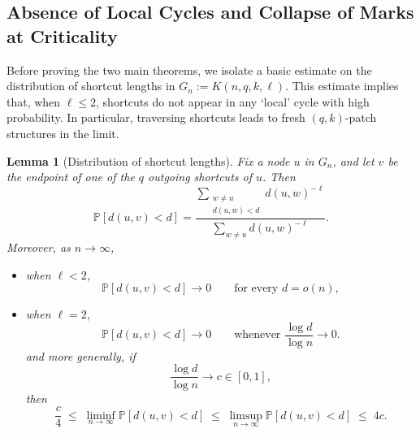 \documentclass[10pt]{amsart}
\newtheorem{lemma}[theorem]{Lemma}
\begin{document}
\subsection{Absence of Local Cycles and Collapse of Marks at Criticality}

Before proving the two main theorems, we isolate a basic estimate on the distribution of shortcut lengths in
\(
G_n:=K(n,q,k,\ell).
\)
This estimate implies that, when $\ell\le 2$, shortcuts do not appear in any `local' cycle with high probability. In particular, traversing shortcuts leads to fresh $(q,k)$-patch structures in the limit.

\begin{lemma}[Distribution of shortcut lengths]\label{shortcut-length-distribution}
Fix a node $u$ in $G_n$, and let $v$ be the endpoint of one of the $q$ outgoing shortcuts of $u$. Then
\[
\mathbb P[d(u,v)<d]
=
\frac{\sum_{\substack{w\neq u\\ d(u,w)<d}} d(u,w)^{-\ell}}
{\sum_{w\neq u} d(u,w)^{-\ell}}.
\]
Moreover, as $n\to\infty$,
\begin{itemize}
    \item when $\ell<2$,
    \[
    \mathbb P[d(u,v)<d]\to 0
    \qquad\text{for every }d=o(n),
    \]
    \item when $\ell=2$,
    \[
    \mathbb P[d(u,v)<d]\to 0
    \qquad\text{whenever }\frac{\log d}{\log n}\to 0.
    \]
    and more generally, if
    \[
    \frac{\log d}{\log n}\to c\in[0,1],
    \]
    then
    \[
    \frac{c}{4}
    \;\le\;
    \liminf_{n\to\infty}\mathbb P[d(u,v)<d]
    \;\le\;
    \limsup_{n\to\infty}\mathbb P[d(u,v)<d]
    \;\le\;
    4c.
    \]
\end{itemize}
\end{lemma}
\end{document}
